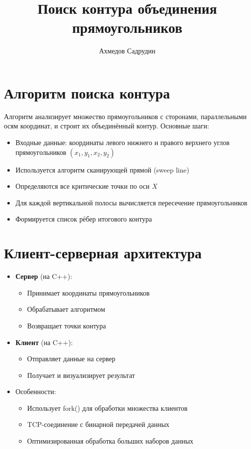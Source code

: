 \documentclass[a4paper, 12pt]{article}
\title{\textbf{Поиск контура объединения прямоугольников}}
\author{Ахмедов Садрудин}
\date{}
\begin{document}
\maketitle


\section*{Алгоритм поиска контура}
Алгоритм анализирует множество прямоугольников с сторонами, параллельными осям координат, и строит их объединённый контур. Основные шаги:

\begin{itemize}
\item Входные данные: координаты левого нижнего и правого верхнего углов прямоугольников $(x_1,y_1,x_2,y_2)$
\item Используется алгоритм сканирующей прямой (sweep line)
\item Определяются все критические точки по оси $X$
\item Для каждой вертикальной полосы вычисляется пересечение прямоугольников
\item Формируется список рёбер итогового контура
\end{itemize}

\section*{Клиент-серверная архитектура}
\begin{itemize}
\item \textbf{Сервер} (на C++):
\begin{itemize}
\item Принимает координаты прямоугольников
\item Обрабатывает алгоритмом
\item Возвращает точки контура
\end{itemize}
\item \textbf{Клиент} (на C++):
\begin{itemize}
\item Отправляет данные на сервер
\item Получает и визуализирует результат
\end{itemize}

\item Особенности:
\begin{itemize}
\item Использует fork() для обработки множества клиентов
\item TCP-соединение с бинарной передачей данных
\item Оптимизированная обработка больших наборов данных
\end{itemize}
\end{itemize}
\end{document}
